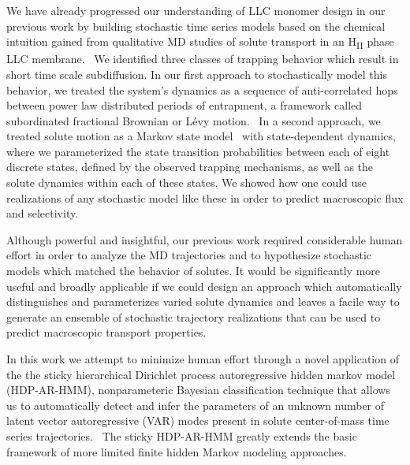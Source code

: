 \documentclass[journal=jpcbfk,manuscript=article]{achemso}
\begin{document}
  We have already progressed our understanding of LLC monomer design in our previous work
  by building stochastic time series models based on the chemical intuition gained
  from qualitative MD studies of solute transport in an H\textsubscript{II} phase LLC
  membrane.~\cite{coscia_chemically_2019,coscia_capturing_2020} We identified three 
  classes of trapping behavior which result in short time scale subdiffusion. In our 
  first approach to stochastically model this behavior, we treated the system's dynamics
  as a sequence of anti-correlated hops between power law distributed periods of 
  entrapment, a framework called subordinated fractional Brownian or L\'evy
  motion.~\cite{thiel_weak_2014,teuerle_modeling_2013} In a second approach, we treated 
  solute motion as a Markov state model~\cite{pande_everything_2010} with state-dependent
  dynamics, where we parameterized the state transition probabilities between each of
  eight discrete states, defined by the observed trapping mechanisms, as well as the 
  solute dynamics within each of these states. We showed how one could use realizations
  of any stochastic model like these in order to predict macroscopic flux and selectivity. 
  
  Although powerful and insightful, our previous work required considerable human effort
  in order to analyze the MD trajectories and to hypothesize stochastic models which
  matched the behavior of solutes. It would be significantly more useful and broadly 
  applicable if we could design an approach which automatically distinguishes and 
  parameterizes varied solute dynamics and leaves a facile way to generate an ensemble
  of stochastic trajectory realizations that can be used to predict macroscopic transport
  properties.
  
  In this work we attempt to minimize human effort through a novel application of the 
  the sticky hierarchical Dirichlet process autoregressive hidden markov model 
  (HDP-AR-HMM), nonparameteric Bayesian classification technique that allows us to 
  automatically detect and infer the parameters of an unknown number of latent vector
  autoregressive (VAR) modes present in solute center-of-mass time series 
  trajectories.~\cite{fox_bayesian_2010} The sticky HDP-AR-HMM greatly extends the 
  basic framework of more limited finite hidden Markov modeling approaches.
    
\end{document}
